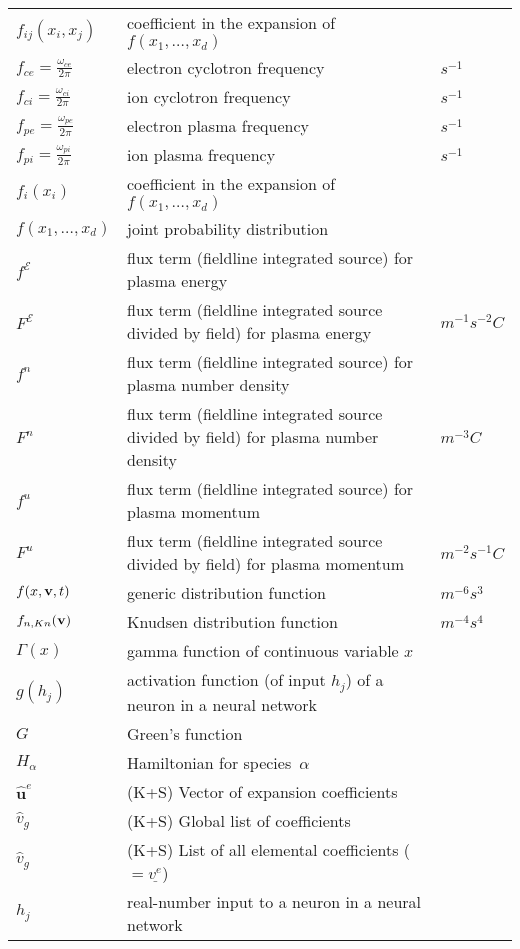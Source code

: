\begin{longtable}{|p{3.0cm}|p{10.0cm}|p{3.0cm}|}
$f_{ij}(x_i,x_j)$ & coefficient in the expansion of $f\left(x_1,\ldots,x_d\right)$  & \\
$f_{ce}= \frac{\omega_{ce}}{2\pi}$ & electron cyclotron frequency & $s^{-1}$ \\
$f_{ci}= \frac{\omega_{ci}}{2\pi}$ & ion cyclotron frequency & $s^{-1}$ \\
$f_{pe}= \frac{\omega_{pe}}{2\pi}$ & electron plasma frequency & $s^{-1}$ \\
$f_{pi}= \frac{\omega_{pi}}{2\pi}$ & ion plasma frequency & $s^{-1}$ \\
$f_i(x_i)$ & coefficient in the expansion of $f\left(x_1,\ldots,x_d\right)$  & \\
$f\left(x_1,\ldots,x_d\right)$ & joint probability distribution  & \\
$f^\mathcal{E}$ & flux term (fieldline integrated source) for plasma energy  & \\
$F^\mathcal{E}$ & flux term (fieldline integrated source divided by field) for plasma energy  &  $m^{-1} s^{-2} C$ \\
$f^n$ & flux term (fieldline integrated source) for plasma number density & \\
$F^n$ & flux term (fieldline integrated source divided by field) for plasma number density  &  $m^{-3} C$ \\
$f^u$ & flux term (fieldline integrated source) for plasma momentum  & \\
$F^u$ & flux term (fieldline integrated source divided by field) for plasma momentum  &  $m^{-2} s^{-1} C$ \\
$f(x,{\bf v},t)$ & generic distribution function & $m^{-6} s^3$ \\
$f_{n,Kn}({\bf v})$ & Knudsen distribution function & $m^{-4} s^4$ \\
$\Gamma(x)$ & gamma function of continuous variable $x$  & \\
$g(h_j)$ & activation function (of input $h_j$) of a neuron in a neural network  & \\
$G$ & Green's function & \\
$H_\alpha$ & Hamiltonian for species~$\alpha$ & \\
$\hat{\boldsymbol{u}}^e$ &  (K+S) Vector of expansion coefficients & \\
$\hat{v}_g$ &  (K+S) Global list of coefficients & \\
$\hat{v}_g$ &  (K+S) List of all elemental coefficients ($=\underline{v^e}$) & \\
$h_j$ & real-number input to a neuron in a neural network  & \\

\end{longtable}
